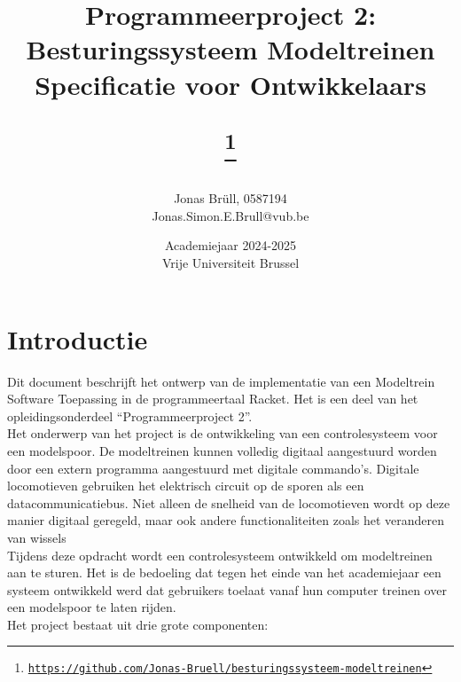 \documentclass[a4paper, 11pt]{article}
\title{Programmeerproject 2: Besturingssysteem Modeltreinen\\ Specificatie voor Ontwikkelaars		
	\author{Jonas Br\"ull, 0587194\\ Jonas.Simon.E.Brull@vub.be\\}
	\date{Academiejaar 2024-2025\\Vrije Universiteit Brussel}
	\thanks{\texttt{\url{https://github.com/Jonas-Bruell/besturingssysteem-modeltreinen}}}
}
\newcommand{\<}{\scriptsize\textless\normalsize}
\renewcommand{\>}{\scriptsize\textgreater\normalsize}
\begin{document}
\maketitle
\newpage

\tableofcontents
\newpage

\pagestyle{fancy}
\setcounter{page}{1}

\section{Introductie} %
Dit document beschrijft het ontwerp van de implementatie van een Modeltrein Software Toepassing in de programmeertaal Racket. Het is een deel van het opleidingsonderdeel ``Programmeerproject 2''.\\
\newline
Het onderwerp van het project is de ontwikkeling van een controlesysteem voor een modelspoor. De modeltreinen kunnen volledig digitaal aangestuurd worden door een extern programma aangestuurd met digitale commando’s. Digitale locomotieven gebruiken het elektrisch circuit op de sporen als een datacommunicatiebus. Niet alleen de snelheid van de locomotieven wordt op deze manier digitaal
geregeld, maar ook andere functionaliteiten zoals het veranderen van wissels\\
\newline
Tijdens deze opdracht wordt een controlesysteem ontwikkeld om modeltreinen aan te sturen. Het is de
bedoeling dat tegen het einde van het academiejaar een systeem ontwikkeld werd dat gebruikers
toelaat vanaf hun computer treinen over een modelspoor te laten rijden.\\
\newline
Het project bestaat uit drie grote componenten:
\end{document}
